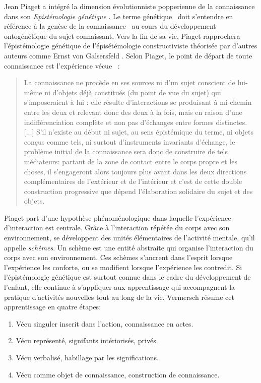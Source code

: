 \noindent
Jean Piaget a intégré la dimension évolutionniste popperienne de la connaissance dans son \emph{Epistémologie génétique} \cite{piaget_lepistemologie_1970}.
Le terme \og génétique \fg\ doit s'entendre en référence à la \og genèse de la connaissance \fg\ au cours du développement ontogénétique du sujet connaissant.
Vers la fin de sa vie, Piaget rapprochera l'épistémologie génétique de l'épisétémologie constructiviste théorisée par d'autres auteurs comme Ernst von Galsersfeld \cite{von_glasersfeld_radical_1995}. 
Selon Piaget, le point de départ de toute connaissance est \og l'expérience vécue \fg\ :

\begin{quote}
	\og La connaissance ne procède en ses sources ni d’un sujet conscient de lui-même ni d’objets déjà constitués (du point de vue du sujet) qui s’imposeraient à lui : elle résulte d’interactions se produisant à mi-chemin entre les deux et relevant donc des deux à la fois, mais en raison d’une indifférenciation complète et non pas d’échanges entre formes distinctes. [...]  
	S’il n’existe au début ni sujet, au sens épistémique du terme, ni objets conçus comme tels, ni surtout d’instruments invariants d’échange, le problème initial de la connaissance sera donc de construire de tels médiateurs: partant de la zone de contact entre le corps propre et les choses, il s’engageront alors toujours plus avant dans les deux directions complémentaires de l’extérieur et de l’intérieur et c’est de cette double construction progressive que dépend l’élaboration solidaire du sujet et des objets. \fg\ 
	\cite[p.~14]{piaget_lepistemologie_1970}
\end{quote}


Piaget part d'une hypothèse phénoménologique dans laquelle l'expérience d'interaction est centrale. 
Grâce à l'interaction répétée du corps avec son environnement, se développent des unités élémentaires de l’activité mentale, qu'il appelle \emph{schèmes}. 
Un schème est une entité abstraite qui organise l'interaction du corps avec son environnement. 
Ces schèmes s'ancrent dans l'esprit lorsque l'expérience les conforte, ou se modifient lorsque l'expérience les contredit. 
Si l'épistémologie génétique est surtout connue dans le cadre du développement de l'enfant, elle continue à s'appliquer aux apprentissage qui accompagnent la pratique d'activités nouvelles tout au long de la vie.  
Vermersch \cite{vermersch_problematique_2014} résume cet apprentissage en quatre étapes: 

\begin{enumerate}%
	\item Vécu singuler inscrit dans l'action, connaissance en actes.
	\item Vécu représenté, signifants intériorisés, privés.
	\item Vécu verbalisé, habillage par les significations.
	\item Vécu comme objet de connaissance, construction de connaissance.
\end{enumerate}

